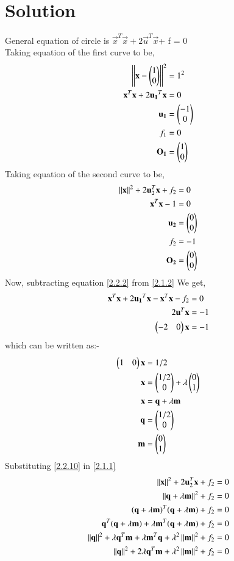 \documentclass[journal,12pt,twocolumn]{IEEEtran}
\begin{document}
\section{\textbf{Solution}}
General equation of circle is ${\vec{x}^T\vec{x}} + 2\vec{u}^T\vec{x} $+ f = 0\\
Taking equation of the first curve to be,
\begin{align}
\left\lVert\mathbf{x}-\begin{pmatrix}1\\0\end{pmatrix}\right\rVert^2&=1^2\\
{\mathbf{x}^{T}\mathbf{x}+2\mathbf{u_1}^T\mathbf{x}}&=0 \label{2.2.2}\\
\mathbf{u_1}&=\begin{pmatrix}-1\\0\end{pmatrix}\\
f_1&=0\\
\mathbf{O_1}&=\begin{pmatrix}1\\0\end{pmatrix}
\end{align}
Taking equation of the second curve to be,
\begin{align}
\left\lVert\mathbf{x}\right\rVert^2 + 2\mathbf{u}_2^T\mathbf{x} + f_2&= 0\label{2.1.1}\\
{\mathbf{x}^{T}\mathbf{x}}-1&=0 \label{2.1.2}\\
\mathbf{u_2}&=\begin{pmatrix}0\\0\end{pmatrix}\\
f_2&=-1\\
\mathbf{O_2}&=\begin{pmatrix}0\\0\end{pmatrix}
\end{align}
Now, subtracting equation \eqref{2.2.2} from \eqref{2.1.2} We get,
\begin{align}
\mathbf{x}^T\mathbf{x}+2\mathbf{u_1}^T\mathbf{x}-\mathbf{x}^{T}\mathbf{x}-f_2&=0\\
2\mathbf{u}^{T}\mathbf{x}&=-1\\
\begin{pmatrix}-2&0\end{pmatrix}\mathbf{x}&=-1
\end{align}
which can be written as:-
\begin{align}
\begin{pmatrix}1&0\end{pmatrix}\mathbf{x}&=1/2 \\
\mathbf{x}&=\begin{pmatrix}1/2 \\ 0\end{pmatrix} + \lambda \begin{pmatrix}0\\1\end{pmatrix} \\
\mathbf{x}&=\mathbf{q}+\lambda\mathbf{m}\label{2.2.10} \\
\mathbf{q}&=\begin{pmatrix}1/2 \\ 0\end{pmatrix} \\
\mathbf{m}&=\begin{pmatrix}0\\1\end{pmatrix}
\end{align}
Substituting \eqref{2.2.10} in \eqref{2.1.1}
\begin{align}
\left\lVert\mathbf{x}\right\rVert^2 + 2\mathbf{u}_2^T\mathbf{x} + f_2&= 0 \\
\left\lVert\mathbf{q}+\lambda\mathbf{m}\right\rVert^2 + f_2&= 0 \\
(\mathbf{q}+\lambda \mathbf{m})^T(\mathbf{q}+\lambda \mathbf{m})+f_2&= 0 \\
\mathbf{q}^T(\mathbf{q}+\lambda \mathbf{m})+\lambda  \mathbf{m}^T(\mathbf{q}+\lambda \mathbf{m})+f_2&= 0 \\ \left\lVert\mathbf{q}\right\rVert^2+\lambda\mathbf{q}^T\mathbf{m}+\lambda\mathbf{m}^T\mathbf{q}+\lambda^2\left\lVert\mathbf{m}\right\rVert^2+f_2&= 0 \\
\left\lVert\mathbf{q}\right\rVert^2+2\lambda\mathbf{q}^T\mathbf{m}+\lambda^2\left\lVert\mathbf{m}\right\rVert^2+f_2&= 0 
\end{align}
\end{document}
